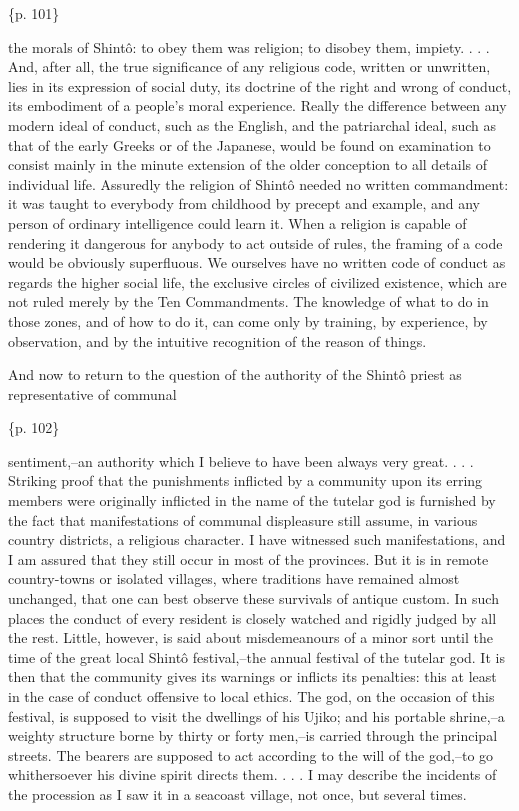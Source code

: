 \{p. 101\}

the morals of Shintô: to obey them was religion; to disobey them, impiety. . . . And, after all, the true significance of any religious code, written or unwritten, lies in its expression of social duty, its doctrine of the right and wrong of conduct, its embodiment of a people's moral experience. Really the difference between any modern ideal of conduct, such as the English, and the patriarchal ideal, such as that of the early Greeks or of the Japanese, would be found on examination to consist mainly in the minute extension of the older conception to all details of individual life. Assuredly the religion of Shintô needed no written commandment: it was taught to everybody from childhood by precept and example, and any person of ordinary intelligence could learn it. When a religion is capable of rendering it dangerous for anybody to act outside of rules, the framing of a code would be obviously superfluous. We ourselves have no written code of conduct as regards the higher social life, the exclusive circles of civilized existence, which are not ruled merely by the Ten Commandments. The knowledge of what to do in those zones, and of how to do it, can come only by training, by experience, by observation, and by the intuitive recognition of the reason of things.



And now to return to the question of the authority of the Shintô priest as representative of communal

\{p. 102\}

sentiment,--an authority which I believe to have been always very great. . . . Striking proof that the punishments inflicted by a community upon its erring members were originally inflicted in the name of the tutelar god is furnished by the fact that manifestations of communal displeasure still assume, in various country districts, a religious character. I have witnessed such manifestations, and I am assured that they still occur in most of the provinces. But it is in remote country-towns or isolated villages, where traditions have remained almost unchanged, that one can best observe these survivals of antique custom. In such places the conduct of every resident is closely watched and rigidly judged by all the rest. Little, however, is said about misdemeanours of a minor sort until the time of the great local Shintô festival,--the annual festival of the tutelar god. It is then that the community gives its warnings or inflicts its penalties: this at least in the case of conduct offensive to local ethics. The god, on the occasion of this festival, is supposed to visit the dwellings of his Ujiko; and his portable shrine,--a weighty structure borne by thirty or forty men,--is carried through the principal streets. The bearers are supposed to act according to the will of the god,--to go whithersoever his divine spirit directs them. . . . I may describe the incidents of the procession as I saw it in a seacoast village, not once, but several times.

